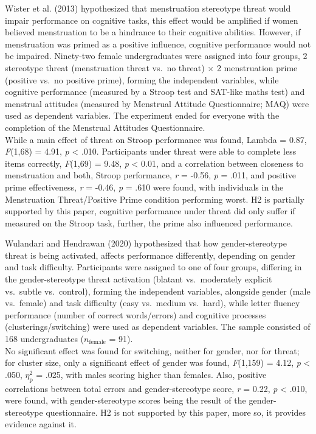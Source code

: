 \documentclass[
  stu, a4paper,floatsintext]{apa7}
\begin{document}
Wister et al. (2013) hypothesized that menstruation stereotype threat would impair performance on cognitive tasks, this effect would be amplified if women believed menstruation to be a hindrance to their cognitive abilities.
However, if menstruation was primed as a positive influence, cognitive performance would not be impaired.
Ninety-two female undergraduates were assigned into four groups, 2 stereotype threat (menstruation threat vs.~no threat) \(\times\) 2 menstruation prime (positive vs.~no positive prime), forming the independent variables, while cognitive performance (measured by a Stroop test and SAT-like maths test) and menstrual attitudes (measured by Menstrual Attitude Questionnaire; MAQ) were used as dependent variables.
The experiment ended for everyone with the completion of the Menstrual Attitudes Questionnaire.\\
While a main effect of threat on Stroop performance was found, Lambda = 0.87, \emph{F}(1,68) = 4.91, \emph{p} \textless{} .010.
Participants under threat were able to complete less items correctly, \emph{F}(1,69) = 9.48, \emph{p} \textless{} 0.01, and a correlation between closeness to menstruation and both, Stroop performance, \emph{r} = -0.56, \emph{p} = .011, and positive prime effectiveness, \emph{r} = -0.46, \emph{p} = .610 were found, with individuals in the Menstruation Threat/Positive Prime condition performing worst.
H2 is partially supported by this paper, cognitive performance under threat did only suffer if measured on the Stroop task, further, the prime also influenced performance.

Wulandari and Hendrawan (2020) hypothesized that how gender-stereotype threat is being activated, affects performance differently, depending on gender and task difficulty.
Participants were assigned to one of four groups, differing in the gender-stereotype threat activation (blatant vs.~moderately explicit vs.~subtle vs.~control), forming the independent variables, alongside gender (male vs.~female) and task difficulty (easy vs.~medium vs.~hard), while letter fluency performance (number of correct words/errors) and cognitive processes (clusterings/switching) were used as dependent variables.
The sample consisted of 168 undergraduates (\(n_{\text{female}}\) = 91).\\
No significant effect was found for switching, neither for gender, nor for threat; for cluster size, only a significant effect of gender was found, \emph{F}(1,159) = 4.12, \emph{p} \textless{} .050, \(\eta^{2}_{\text{p}}\) = .025, with males scoring higher than females.
Also, positive correlations between total errors and gender-stereotype score, \emph{r} = 0.22, \emph{p} \textless{} .010, were found, with gender-stereotype scores being the result of the gender-stereotype questionnaire.
H2 is not supported by this paper, more so, it provides evidence against it.
\end{document}
